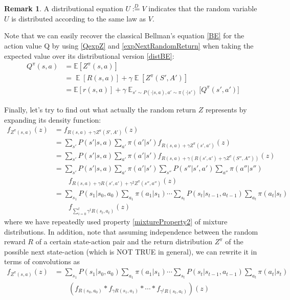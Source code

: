 \documentclass[12pt,a4paper,openright,twoside]{article}
\DeclareMathOperator*{\E}{\mathbb{E}}
\numberwithin{equation}{section}
\theoremstyle{definition}
\newtheorem*{remark}{Remark}
\theoremstyle{remark}
\theoremstyle{plain}
\begin{document}
\begin{remark}
A distributional equation $U \stackrel{D}{:=} V$ indicates that the random variable $U$ is distributed according to the same law as $V$.	
\end{remark}

Note that we can easily recover the classical Bellman's equation \ref{BE} for the action value Q by using \ref{QexpZ} and \ref{expNextRandomReturn} when taking the expected value over its distributional version \ref{distBE}:
\begin{equation}
\begin{split}
    Q^\pi(s,a) &= \mathbb{E} [Z^\pi(s,a)] \\
    &= \E[R(s,a)] + \gamma \E[Z^\pi(S',A')] \\
    &= \mathbb{E} [r(s,a)] + \gamma \E_{s'\sim P(\cdot | s,a), a' \sim \pi(\cdot | s')} \bigg[Q^\pi(s',a') \bigg] 
\end{split}
\end{equation}

Finally, let's try to find out what actually the random return $Z$ represents by expanding its density function: 
\begin{equation} \label{meaningZ}
\begin{split}
    f_{Z^\pi(s,a)}(z) &= f_{R(s,a) + \gamma Z^\pi(S',A')}(z)  \\
    &=  \sum_{s'} P(s' | s,a) \sum_{a'} \pi(a'|s') f_{R(s,a) + \gamma Z^\pi(s',a')}(z) \\
    &= \sum_{s'} P(s' | s,a) \sum_{a'} \pi(a'|s') f_{R(s,a) + \gamma (R(s',a') + \gamma Z^\pi(S'',A''))}(z) \\
    &= \sum_{s'} P(s' | s,a) \sum_{a'} \pi(a'|s') \sum_{s''} P(s'' | s',a') \sum_{a''} \pi(a''|s'') \\
    & \quad \quad f_{R(s,a) + \gamma R(s',a') + \gamma^2 Z^\pi(s'',a'')} (z) \\
    &= \sum_{s_{1}} P(s_{1} | s_{0},a_{0}) \sum_{a_{1}} \pi(a_{1}|s_{1})  \cdots \sum_{s_{t}} P(s_{t} | s_{t-1},a_{t-1}) \sum_{a_{t}} \pi(a_{t}|s_{t}) \\
    & \quad \quad f_{\sum_{i=0}^{t} \gamma^t R(s_{t},a_{t})} (z)
\end{split}
\end{equation}
where we have repeatedly used property \ref{mixtureProperty2} of mixture distributions. In addition, note that assuming independence between the random reward $R$ of a certain state-action pair and the return distribution $Z^\pi$ of the possible next state-action (which is NOT TRUE in general), we can rewrite it in terms of convolutions as
\begin{equation}
\begin{split}
    f_{Z^\pi(s,a)}(z) &= \sum_{s_{1}} P(s_{1} | s_{0},a_{0}) \sum_{a_{1}} \pi(a_{1}|s_{1})  \cdots \sum_{s_{t}} P(s_{t} | s_{t-1},a_{t-1}) \sum_{a_{t}} \pi(a_{t}|s_{t}) \\
    & \quad \quad  \left( f_{R(s_0,a_0)} * f_{\gamma R(s_1,a_1)} *  \cdots * f_{\gamma^t R(s_{t},a_{t})} \right) (z)
\end{split}
\end{equation}
\end{document}
